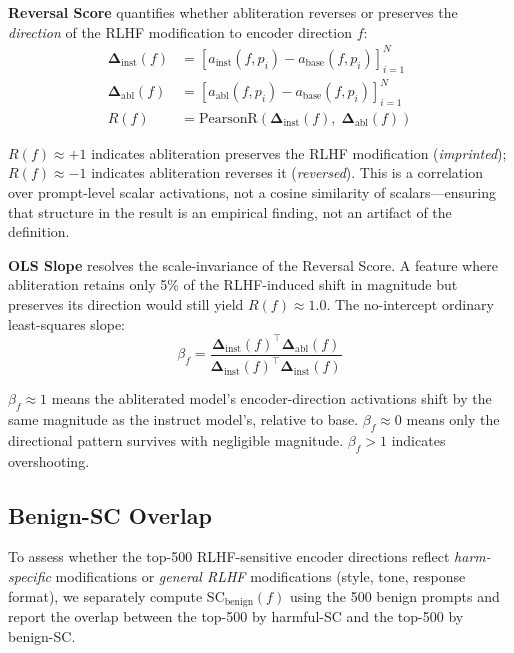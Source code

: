 \documentclass[11pt,letterpaper]{article}
\begin{document}
\noindent\textbf{Reversal Score} quantifies whether abliteration reverses or preserves the
\emph{direction} of the RLHF modification to encoder direction $f$:
\begin{align}
  \boldsymbol{\Delta}_{\text{inst}}(f) &= [a_{\text{inst}}(f, p_i) - a_{\text{base}}(f, p_i)]_{i=1}^N \\
  \boldsymbol{\Delta}_{\text{abl}}(f)  &= [a_{\text{abl}}(f, p_i)  - a_{\text{base}}(f, p_i)]_{i=1}^N \\
  R(f) &= \text{PearsonR}(\boldsymbol{\Delta}_{\text{inst}}(f),\; \boldsymbol{\Delta}_{\text{abl}}(f))
\end{align}

$R(f) \approx +1$ indicates abliteration preserves the RLHF modification (\emph{imprinted});
$R(f) \approx -1$ indicates abliteration reverses it (\emph{reversed}). This is a correlation over
prompt-level scalar activations, not a cosine similarity of scalars---ensuring that structure in the
result is an empirical finding, not an artifact of the definition.

\noindent\textbf{OLS Slope} resolves the scale-invariance of the Reversal Score. A feature where
abliteration retains only 5\% of the RLHF-induced shift in magnitude but preserves its direction
would still yield $R(f) \approx 1.0$. The no-intercept ordinary least-squares slope:
\begin{equation}
  \beta_f = \frac{\boldsymbol{\Delta}_{\text{inst}}(f)^\top \boldsymbol{\Delta}_{\text{abl}}(f)}
                 {\boldsymbol{\Delta}_{\text{inst}}(f)^\top \boldsymbol{\Delta}_{\text{inst}}(f)}
\end{equation}

$\beta_f \approx 1$ means the abliterated model's encoder-direction activations shift by the same
magnitude as the instruct model's, relative to base. $\beta_f \approx 0$ means only the directional
pattern survives with negligible magnitude. $\beta_f > 1$ indicates overshooting.

\subsection{Benign-SC Overlap}
\label{sec:benign}

To assess whether the top-500 RLHF-sensitive encoder directions reflect \emph{harm-specific}
modifications or \emph{general RLHF} modifications (style, tone, response format), we separately
compute $\text{SC}_{\text{benign}}(f)$ using the 500 benign prompts and report the overlap between
the top-500 by harmful-SC and the top-500 by benign-SC.
\end{document}

